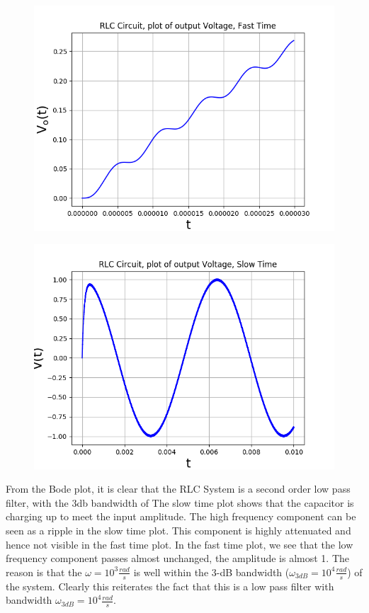 \documentclass[11pt, a4paper]{article}
\begin{document}
\begin{figure}[!tbh]
   	\centering
   	\includegraphics[scale=0.5]{img7.png}
   	\label{fig:32}
   \end{figure}
\begin{figure}[!tbh]
   	\centering
   	\includegraphics[scale=0.5]{img8.png}
   	\label{fig:32}
   \end{figure}
{
From the Bode plot, it is clear that the RLC System is a second order low pass filter, with the 3db bandwidth of 
The slow time plot shows that the capacitor is charging up to meet the input amplitude. The high frequency component can be seen as a ripple in the slow time plot.  This component is highly attenuated and hence not visible in the fast time plot.
In the fast time plot, we see that the low frequency component passes almost unchanged, the amplitude is almost 1.
The reason is that the $\omega = 10^3\frac{rad}{s}$ is well within the 3-dB bandwidth ($\omega_{3dB} = 10^4\frac{rad}{s}$) of the system.
Clearly this reiterates the fact that this is a low pass filter with bandwidth $\omega_{3dB} = 10^4\frac{rad}{s}$.

}
\end{document}
